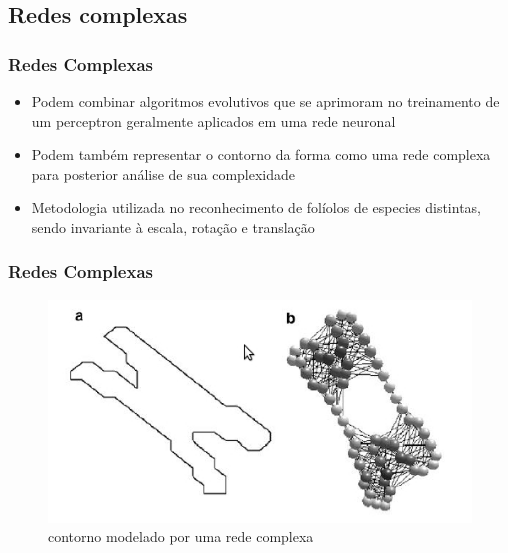 \documentclass[brazil,a4paper,12pt]{beamer}%
\begin{document}
   \subsection{Redes complexas}
     \begin{frame}
      \frametitle{Redes Complexas}
	\begin{itemize}
	 \item{Podem combinar algoritmos evolutivos que se aprimoram no treinamento de um perceptron geralmente aplicados em uma rede neuronal}
	 \item{Podem também representar o contorno da forma como uma rede complexa para posterior análise de sua complexidade}
	 \item{Metodologia utilizada no reconhecimento de folíolos de especies distintas, sendo invariante à escala, rotação e translação}
	\end{itemize}
     \end{frame}
     \begin{frame}
      \frametitle{Redes Complexas}

	\begin{figure}[h!]
	\centering
	  \includegraphics[width = 5 cm]{./imgs/rede.jpg}
	\caption{contorno modelado por uma rede complexa}
	\end{figure}


     \end{frame}
\end{document}
